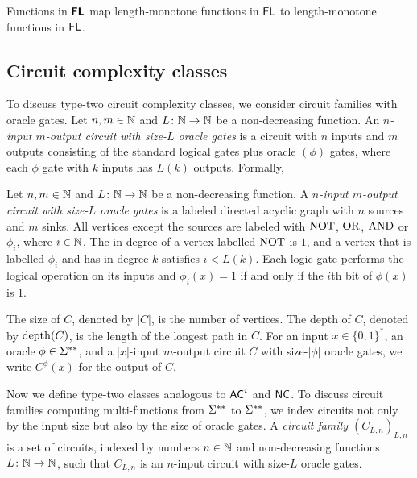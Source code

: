 \documentclass[envcountsame,orivec,oribibl]{llncs}
\begin{document}
\begin{lemma}
\label{lemma:Ltwo-maps-L-to-L}
 Functions in $\text{\bfseries \sffamily \upshape FL}$ map 
 length-monotone functions in $\mathsf{FL}$
 to length-monotone functions in $\mathsf{FL}$.
\end{lemma}


\subsection{Circuit complexity classes}

To discuss type-two circuit complexity classes,
we consider circuit families with oracle gates.
Let $n, m \in \mathbb N$ and $L \colon \mathbb N \to \mathbb N$ be a non-decreasing function.
An \emph{$n$-input $m$-output circuit with size-$L$ oracle gates} is a circuit with
$n$ inputs and $m$ outputs consisting of the standard logical gates 
plus oracle $(\phi)$ gates, 
where each $\phi$ gate with $k$ inputs has $L(k)$ outputs.
Formally, 

\begin{definition}
Let $n, m \in \mathbb N$ and $L \colon \mathbb N \to \mathbb N$ be a non-decreasing function.
A \emph{$n$-input $m$-output circuit with size-$L$ oracle gates} is 
a labeled directed acyclic graph with $n$ sources and $m$ sinks.
All vertices except the sources are labeled with $\mathrm{NOT}$, $\mathrm{OR}$, $\mathrm{AND}$ 
or $\phi _i$, where $i \in \mathbb N$.
The in-degree of a vertex labelled $\mathrm{NOT}$ is $1$, and
a vertex that is labelled $\phi _i$ and has in-degree $k$ 
satisfies $i < L(k)$.
Each logic gate performs the logical operation on its inputs
and $\phi_i(x) = 1$ if and only if the $i$th bit of $\phi(x)$ is $1$.

The size of $C$, denoted by $|C|$, is the number of vertices.
The depth of $C$, denoted by $\mathop{\rm depth}(C)$, is the length of the longest path in $C$.
For an input $x \in \{0, 1\}^*$, an oracle $\phi \in \Sigma ^{**}$, 
and a $|x|$-input $m$-output circuit $C$ with size-$|\phi|$ oracle gates, 
we write $C^\phi(x)$ for the output of $C$.
\end{definition}


Now we define type-two classes analogous to 
$\mathsf{AC}^i$ and $\mathsf{NC}$.
To discuss circuit families computing multi-functions from $\Sigma ^{**}$ to $\Sigma ^{**}$,
we index circuits not only by the input size but also by the size of oracle gates.
A {\em circuit family $(C_{L,n})_{L,n}$} is a set of circuits, 
indexed by numbers $n \in \mathbb N$ and non-decreasing functions $L \colon \mathbb N \to \mathbb N$,
such that $C_{L, n}$ is an $n$-input circuit with size-$L$ oracle gates.
\end{document}
